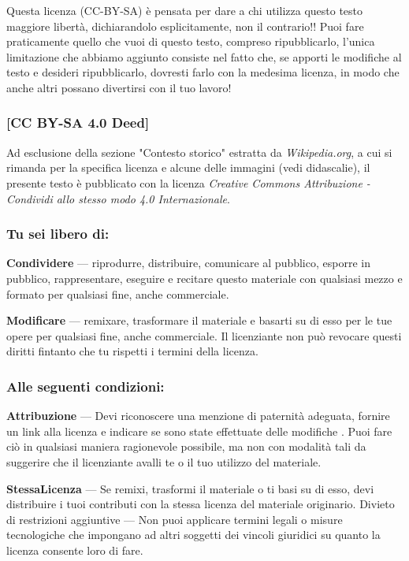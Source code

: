 \documentclass[letterpaper,twocolumn,openany,nodeprecatedcode]{dndbook}
\begin{document}
Questa licenza (CC-BY-SA) è pensata per dare a chi utilizza questo testo maggiore libertà, dichiarandolo esplicitamente, non il contrario!! Puoi fare praticamente quello che vuoi di questo testo, compreso ripubblicarlo, l'unica limitazione che abbiamo aggiunto consiste nel fatto che, se apporti le modifiche al testo e desideri ripubblicarlo, dovresti farlo con la medesima licenza, in modo che anche altri possano divertirsi con il tuo lavoro!

\subsubsection{[CC BY-SA 4.0 Deed]}
Ad esclusione della sezione "Contesto storico" estratta da \textit{Wikipedia.org}, a cui si rimanda per la specifica licenza e alcune delle immagini (vedi didascalie), il presente testo è pubblicato con la licenza \textit{Creative Commons Attribuzione - Condividi allo stesso modo 4.0 Internazionale}.

\subsubsection{Tu sei libero di:}

    \textbf{Condividere} — riprodurre, distribuire, comunicare al pubblico, esporre in pubblico, rappresentare, eseguire e recitare questo materiale con qualsiasi mezzo e formato per qualsiasi fine, anche commerciale.
    
    \textbf{Modificare} — remixare, trasformare il materiale e basarti su di esso per le tue opere per qualsiasi fine, anche commerciale.
    Il licenziante non può revocare questi diritti fintanto che tu rispetti i termini della licenza.

\subsubsection{Alle seguenti condizioni:}

    \textbf{Attribuzione} — Devi riconoscere una menzione di paternità adeguata, fornire un link alla licenza e indicare se sono state effettuate delle modifiche . Puoi fare ciò in qualsiasi maniera ragionevole possibile, ma non con modalità tali da suggerire che il licenziante avalli te o il tuo utilizzo del materiale.
    
    \textbf{StessaLicenza} — Se remixi, trasformi il materiale o ti basi su di esso, devi distribuire i tuoi contributi con la stessa licenza del materiale originario.
    Divieto di restrizioni aggiuntive — Non puoi applicare termini legali o misure tecnologiche che impongano ad altri soggetti dei vincoli giuridici su quanto la licenza consente loro di fare.
\end{document}
